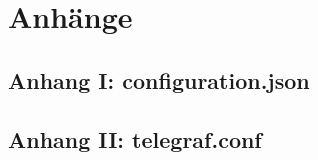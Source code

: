 \documentclass[a4paper, 12pt, oneside, toc=listofnumbered, bibliography=totoc]{scrbook}
\begin{document}
	\printbibliography
	\frontmatter
	
	\pagebreak
	\chapter{Anhänge} %
	\section*{Anhang I: configuration.json}
	
	\pagebreak
	\section*{Anhang II: telegraf.conf}
	
	\pagebreak
\end{document}
